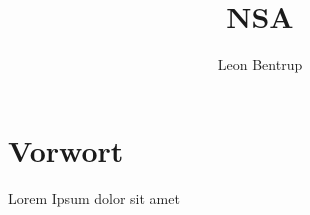 \documentclass[12pt,a4paper]{report}
\author{Leon Bentrup}
\title{NSA}
\begin{document}
\maketitle
\tableofcontents

\chapter{Vorwort}
Lorem Ipsum dolor sit amet
\end{document}
